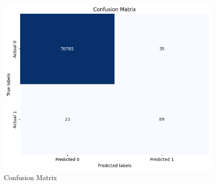 \begin{figure}[ht]
    \centering
    \includegraphics[scale=0.6]{figures/CM_CatBoost.png}
    \caption{Confusion Matrix}
    \label{fig:Plot of the Data}
\end{figure}

\clearpage




